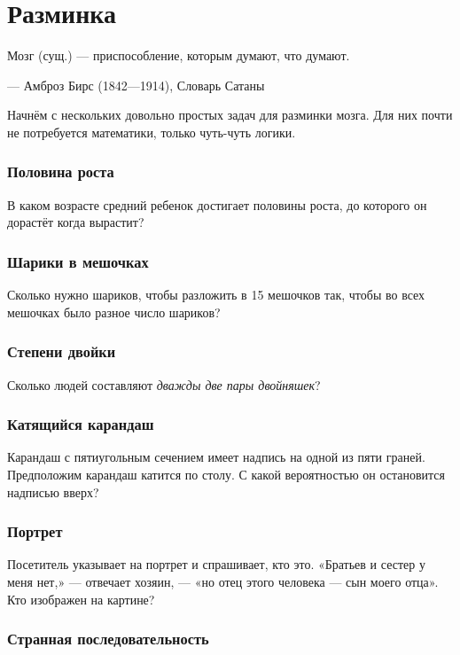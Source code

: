 \chapter{Разминка}


\setlength{\epigraphwidth}{.80\textwidth}
\epigraph{Мозг (сущ.) --- приспособление, которым думают, что думают.}{--- Амброз Бирс (1842---1914), Словарь Сатаны}

Начнём с нескольких довольно простых задач для разминки мозга.
Для них почти не потребуется математики, только чуть-чуть логики.

\subsection*{Половина роста}

В каком возрасте средний ребенок достигает половины роста, до которого он дорастёт когда вырастит?

\subsection*{Шарики в мешочках}

Сколько нужно шариков, чтобы разложить в 15 мешочков так,
чтобы во всех мешочках было разное число шариков?

\subsection*{Степени двойки}

Сколько людей составляют \emph{дважды две пары двойняшек}?

\subsection*{Катящийся карандаш}

Карандаш с пятиугольным сечением имеет надпись на одной из пяти граней.
Предположим карандаш катится по столу.
С какой вероятностью он остановится надписью вверх?

\subsection*{Портрет}

Посетитель указывает на портрет и спрашивает, кто это. 
«Братьев и сестер у меня нет,» --- отвечает хозяин, --- «но отец этого человека --- сын моего отца».
Кто изображен на картине?

\subsection*{Странная последовательность}

